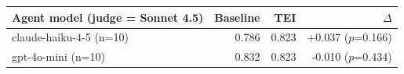\begin{tabular}{lrrr}
\toprule
Agent model (judge = Sonnet 4.5) & Baseline & TEI & $\Delta$ \\
\midrule
claude-haiku-4-5 (n=10) & 0.786 & 0.823 & +0.037 ($p$=0.166) \\
gpt-4o-mini (n=10) & 0.832 & 0.823 & -0.010 ($p$=0.434) \\
\bottomrule
\end{tabular}